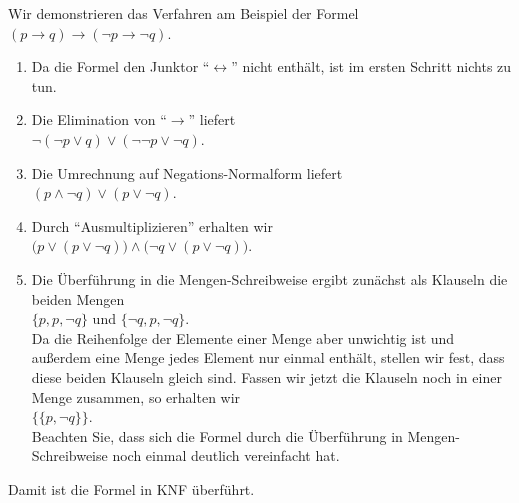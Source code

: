Wir demonstrieren das Verfahren am Beispiel der Formel\\[0.2cm]
\hspace*{1.3cm} $(p \rightarrow q) \rightarrow (\neg p \rightarrow \neg q)$.
\begin{enumerate}
\item Da die Formel den Junktor ``$\leftrightarrow$'' nicht enth\"{a}lt,
      ist im ersten Schritt nichts zu tun.
\item Die Elimination von ``$\rightarrow$'' liefert \\[0.2cm]
      \hspace*{1.3cm} $\neg (\neg p \vee q) \vee (\neg \neg p \vee \neg q)$.
\item Die Umrechnung auf Negations-Normalform liefert \\[0.2cm]
      \hspace*{1.3cm} $(p \wedge \neg q) \vee (p \vee \neg q)$.
\item Durch ``Ausmultiplizieren'' erhalten wir \\[0.2cm]
      \hspace*{1.3cm} $\bigl(p \vee (p \vee \neg q)\bigr) \wedge \bigl(\neg q \vee (p \vee \neg q)\bigr)$.
\item Die \"{U}berf\"{u}hrung in die Mengen-Schreibweise ergibt zun\"{a}chst als Klauseln die beiden Mengen \\[0.2cm]
      \hspace*{1.3cm} $\{p, p, \neg q\}$ \quad und \quad $\{\neg q,  p,  \neg q\}$. \\[0.2cm]
      Da die Reihenfolge der Elemente einer Menge aber unwichtig ist und au\ss{}erdem eine Menge
      jedes Element nur einmal enth\"{a}lt, stellen wir fest, dass diese beiden Klauseln gleich sind.
      Fassen wir jetzt die Klauseln noch in einer Menge zusammen, so erhalten wir \\[0.2cm]
      \hspace*{1.3cm} $\bigl\{ \{p, \neg q\} \bigr\}$. \\[0.2cm]
      Beachten Sie, dass sich die Formel durch die \"{U}berf\"{u}hrung in 
      Mengen-Schreibweise noch einmal deutlich vereinfacht hat.
\end{enumerate}
Damit ist die Formel in KNF \"{u}berf\"{u}hrt.

